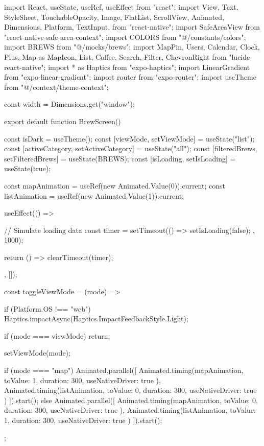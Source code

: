 import React, { useState, useRef, useEffect } from "react";
import {
  View,
  Text,
  StyleSheet,
  TouchableOpacity,
  Image,
  FlatList,
  ScrollView,
  Animated,
  Dimensions,
  Platform,
  TextInput,
} from "react-native";
import { SafeAreaView } from "react-native-safe-area-context";
import { COLORS } from "@/constants/colors";
import { BREWS } from "@/mocks/brews";
import { 
  MapPin, 
  Users, 
  Calendar, 
  Clock, 
  Plus, 
  Map as MapIcon, 
  List, 
  Coffee, 
  Search,
  Filter,
  ChevronRight
} from "lucide-react-native";
import * as Haptics from "expo-haptics";
import { LinearGradient } from "expo-linear-gradient";
import { router } from "expo-router";
import { useTheme } from "@/context/theme-context";

const { width } = Dimensions.get("window");

export default function BrewScreen() {
  const { isDark } = useTheme();
  const [viewMode, setViewMode] = useState("list");
  const [activeCategory, setActiveCategory] = useState("all");
  const [filteredBrews, setFilteredBrews] = useState(BREWS);
  const [isLoading, setIsLoading] = useState(true);
  
  const mapAnimation = useRef(new Animated.Value(0)).current;
  const listAnimation = useRef(new Animated.Value(1)).current;
  
  useEffect(() => {
    // Simulate loading data
    const timer = setTimeout(() => {
      setIsLoading(false);
    }, 1000);
    
    return () => clearTimeout(timer);
  }, []);
  
  const toggleViewMode = (mode) => {
    if (Platform.OS !== "web") {
      Haptics.impactAsync(Haptics.ImpactFeedbackStyle.Light);
    }
    
    if (mode === viewMode) return;
    
    setViewMode(mode);
    
    if (mode === "map") {
      Animated.parallel([
        Animated.timing(mapAnimation, {
          toValue: 1,
          duration: 300,
          useNativeDriver: true
        }),
        Animated.timing(listAnimation, {
          toValue: 0,
          duration: 300,
          useNativeDriver: true
        })
      ]).start();
    } else {
      Animated.parallel([
        Animated.timing(mapAnimation, {
          toValue: 0,
          duration: 300,
          useNativeDriver: true
        }),
        Animated.timing(listAnimation, {
          toValue: 1,
          duration: 300,
          useNativeDriver: true
        })
      ]).start();
    }
  };
  
}
